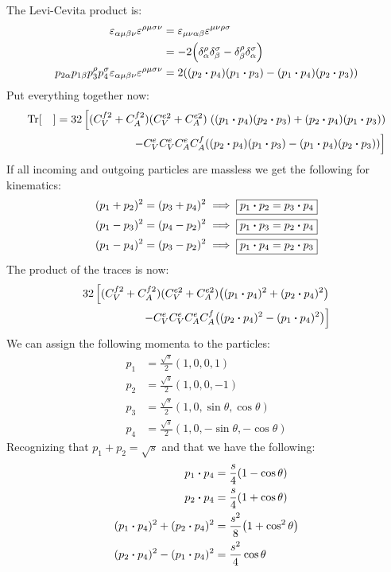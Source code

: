 \documentclass[12pt]{article}
\newcommand{\munu}{{\mu\nu}}
\newcommand{\veps}{\varepsilon}
\begin{document}
The Levi-Cevita product is:
\begin{align*}
  \veps_{\alpha\mu\beta\nu}\veps^{\rho\mu\sigma\nu}&=
  \veps_{\munu\alpha\beta}\veps^{\munu\rho\sigma}\\
  &=-2\qty(\delta^\rho_\alpha\delta^\sigma_\beta
  -\delta^\rho_\beta\delta^\sigma_\alpha)\\
  p_{2\alpha}p_{1\beta}p_3^{\rho}p_4^\sigma
  \veps_{\alpha\mu\beta\nu}\veps^{\rho\mu\sigma\nu}&=
  2\qty((p_2\vdot p_4)(p_1\vdot p_3)-(p_1\vdot p_4)(p_2\vdot p_3))
\end{align*}
Put everything together now:
\begin{align*}
  \Tr[\quad]=32\left[(C_V^{f2}+C_A^{f2})(C_V^{e2}+C_A^{e2})\right.
  \qty((p_1\vdot p_4)(p_2\vdot p_3)+(p_2\vdot p_4)(p_1\vdot p_3))\\
  \left.-C_V^eC_V^eC_A^eC_A^f\qty((p_2\vdot p_4)(p_1\vdot p_3)
    -(p_1\vdot p_4)(p_2\vdot p_3))\right]
\end{align*}
If all incoming and outgoing particles are massless we get the following for kinematics:
\begin{align*}
  (p_1+p_2)^2=(p_3+p_4)^2\implies \boxed{p_1\vdot p_2=p_3\vdot p_4}\\
  (p_1-p_3)^2=(p_4-p_2)^2\implies \boxed{p_1\vdot p_3=p_2\vdot p_4}\\
  (p_1-p_4)^2=(p_3-p_2)^2\implies \boxed{p_1\vdot p_4=p_2\vdot p_3}
\end{align*}
The product of the traces is now:
\begin{align*}
  32\left[(C_V^{f2}+C_A^{f2})(C_V^{e2}+C_A^{e2})
    \qty((p_1\vdot p_4)^2+(p_2\vdot p_4)^2)\right.\\
  \left.-C_V^eC_V^eC_A^eC_A^f\qty((p_2\vdot p_4)^2
    -(p_1\vdot p_4)^2)\right]
\end{align*}
We can assign the following momenta to the particles:
\begin{align*}
  p_1&=\frac{\sqrt{s}}{2}(1,0,0,1)\\
  p_2&=\frac{\sqrt{s}}{2}(1,0,0,-1)\\
  p_3&=\frac{\sqrt{s}}{2}(1,0,\sin\theta,\cos\theta)\\
  p_4&=\frac{\sqrt{s}}{2}(1,0,-\sin\theta,-\cos\theta)
\end{align*}
Recognizing that $p_1+p_2=\sqrt{s}$ and that we have the following:
\begin{align*}
  p_1\vdot p_4&=\frac{s}{4}(1-\cos\theta)\\
  p_2\vdot p_4&=\frac{s}{4}(1+\cos\theta)\\
  (p_1\vdot p_4)^2+(p_2\vdot p_4)^2&=\frac{s^2}{8}\qty(1+\cos^2\theta)\\
  (p_2\vdot p_4)^2-(p_1\vdot p_4)^2&=\frac{s^2}{4}\cos\theta
\end{align*}
\end{document}
